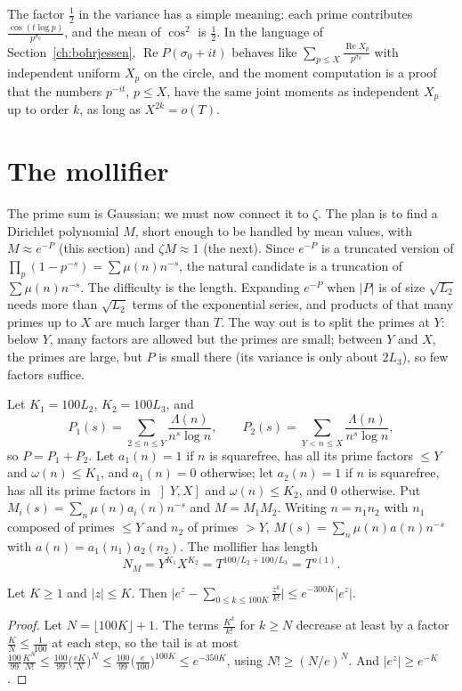 The factor $\frac12$ in the variance has a simple meaning: each prime contributes $\frac{\cos(t\log p)}{p^{\sigma_0}}$, and the mean of $\cos^2$ is $\frac12$. In the language of Section~\ref{ch:bohrjessen}, $\operatorname{Re}P(\sigma_0+it)$ behaves like $\sum_{p\le X}\frac{\operatorname{Re}X_p}{p^{\sigma_0}}$ with independent uniform $X_p$ on the circle, and the moment computation is a proof that the numbers $p^{-it}$, $p\le X$, have the same joint moments as independent $X_p$ up to order $k$, as long as $X^{2k}=o(T)$.

\section{The mollifier}

The prime sum is Gaussian; we must now connect it to $\zeta$. The plan is to find a Dirichlet polynomial $M$, short enough to be handled by mean values, with $M\approx e^{-P}$ (this section) and $\zeta M\approx1$ (the next). Since $e^{-P}$ is a truncated version of $\prod_p(1-p^{-s})=\sum\mu(n)n^{-s}$, the natural candidate is a truncation of $\sum\mu(n)n^{-s}$. The difficulty is the length. Expanding $e^{-P}$ when $|P|$ is of size $\sqrt{L_2}$ needs more than $\sqrt{L_2}$ terms of the exponential series, and products of that many primes up to $X$ are much larger than $T$. The way out is to split the primes at $Y$: below $Y$, many factors are allowed but the primes are small; between $Y$ and $X$, the primes are large, but $P$ is small there (its variance is only about $2L_3$), so few factors suffice.

Let $K_1=100L_2$, $K_2=100L_3$, and
\[
P_1(s)=\sum_{2\le n\le Y}\frac{\Lambda(n)}{n^s\log n},\qquad P_2(s)=\sum_{Y<n\le X}\frac{\Lambda(n)}{n^s\log n},
\]
so $P=P_1+P_2$. Let $a_1(n)=1$ if $n$ is squarefree, has all its prime factors $\le Y$ and $\omega(n)\le K_1$, and $a_1(n)=0$ otherwise; let $a_2(n)=1$ if $n$ is squarefree, has all its prime factors in $\left]Y,X\right]$ and $\omega(n)\le K_2$, and $0$ otherwise. Put $M_i(s)=\sum_n\mu(n)a_i(n)n^{-s}$ and $M=M_1M_2$. Writing $n=n_1n_2$ with $n_1$ composed of primes $\le Y$ and $n_2$ of primes $>Y$, $M(s)=\sum_n\mu(n)a(n)n^{-s}$ with $a(n)=a_1(n_1)a_2(n_2)$. The mollifier has length
\[
N_M=Y^{K_1}X^{K_2}=T^{100/L_2+100/L_3}=T^{o(1)}.
\]

\begin{lemma}\label{lem:truncexp}
Let $K\ge1$ and $|z|\le K$. Then $\bigl|e^z-\sum_{0\le k\le100K}\frac{z^k}{k!}\bigr|\le e^{-300K}|e^z|$.
\end{lemma}
\begin{proof}
Let $N=\lfloor100K\rfloor+1$. The terms $\frac{K^k}{k!}$ for $k\ge N$ decrease at least by a factor $\frac KN\le\frac1{100}$ at each step, so the tail is at most $\frac{100}{99}\frac{K^N}{N!}\le\frac{100}{99}\bigl(\frac{eK}N\bigr)^N\le\frac{100}{99}\bigl(\frac e{100}\bigr)^{100K}\le e^{-350K}$, using $N!\ge(N/e)^N$. And $|e^z|\ge e^{-K}$.
\end{proof}

